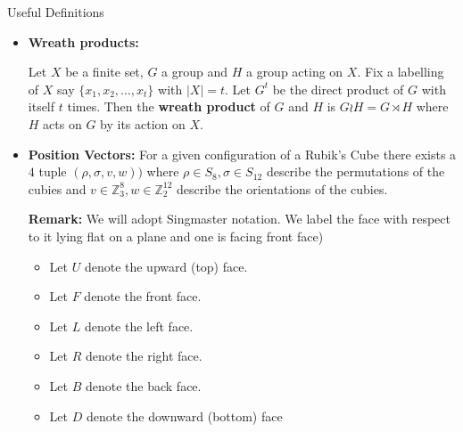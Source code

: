 \documentclass[final]{beamer}
\newlength{\colwidth}
\begin{document}
\begin{frame}[t]
\begin{columns}[t]
\begin{column}{\colwidth}
\begin{alertblock}{Useful Definitions}
\begin{itemize}
\item  \textbf{Wreath products:}

Let $X$ be a finite set, $G$ a group and $H$ a group acting on $X$.
Fix a labelling of $X$ say $\{x_1,x_2, \dots, x_t\}$ with $| X | = t$.
Let $G^t$ be the direct product of $G$ with itself $t$ times.
Then the \textbf{wreath product} of $G$ and $H$ is $G \wr H = G \rtimes H$ where $H$ acts on $G$ by its action on $X$.





    

\item \textbf{Position Vectors:}
For a given configuration of a Rubik's Cube there exists a $4$ tuple $(\rho, \sigma, v, w))$ where $\rho \in S_8, \sigma \in S_{12}$ describe the permutations of the cubies and $v \in \mathbb Z_3^8, w \in \mathbb Z_2^{12}$ describe the orientations of the cubies.

\textbf{Remark:} 
We will adopt Singmaster notation. 
We label the face with respect to it lying
flat on a plane and one is facing front face)

\begin{itemize}
\item Let $U$ denote the upward (top) face.
\item Let $F$ denote the front face.
\item Let $L$ denote the left face.
\item Let $R$ denote the right face.
\item Let $B$ denote the back face.
\item Let $D$ denote the downward (bottom) face
\end{itemize}


\end{itemize}
\end{alertblock}
\end{column}
\end{columns}
\end{frame}
\end{document}
